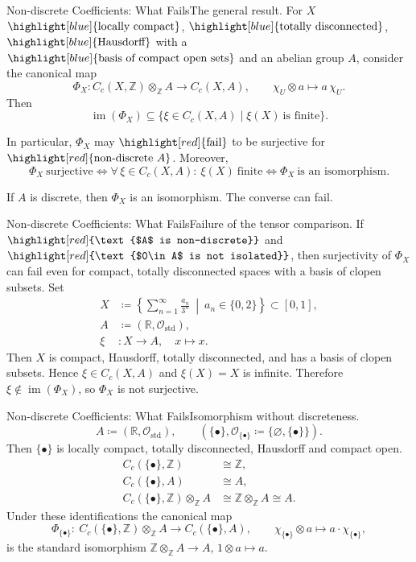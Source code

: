 \documentclass[aspectratio=169]{beamer}
\newcommand{\ZZ}{\mathbb{Z}}
\begin{document}
\begin{frame}{Non-discrete Coefficients: What Fails}{The general result.}
For \(X\) $\highlight[blue]{\text{locally compact}}$, $\highlight[blue]{\text{totally disconnected}}$, $\highlight[blue]{\text{Hausdorff}}$ with a $\highlight[blue]{\text{basis of compact open sets}}$ and an abelian group \(A\), consider the canonical map
\[
\Phi_X\colon C_c(X,\ZZ)\otimes_{\ZZ}A \to C_c(X,A),
\qquad
\chi_U\otimes a \mapsto a\,\chi_U.
\]
Then
\[
\operatorname{im}(\Phi_X)\subseteq \{\xi\in C_c(X,A)\mid \xi(X)\ \text{is finite}\}.
\]
\pause

In particular, \(\Phi_X\) may $\highlight[red]{\text{fail}}$ to be surjective for $\highlight[red]{\text{non-discrete } A}$.
Moreover,
\[
\Phi_X\ \text{surjective}
\Leftrightarrow
\forall\,\xi\in C_c(X,A):\ \xi(X)\ \text{finite}
\Leftrightarrow
\Phi_X\ \text{is an isomorphism}.
\]
\pause

If \(A\) is discrete, then \(\Phi_X\) is an isomorphism.
The converse can fail.
\end{frame}

\begin{frame}{Non-discrete Coefficients: What Fails}{Failure of the tensor comparison.}
If $\highlight[red]{\text{$A$ is non-discrete}}$ and $\highlight[red]{\text{$0\in A$ is not isolated}}$, then surjectivity of \(\Phi_X\) can fail even for compact, totally disconnected spaces with a basis of clopen subsets.
Set
\[
\begin{aligned}
X &\coloneqq \left\{\sum_{n=1}^\infty \frac{a_n}{3^n}\ \middle|\ a_n\in\{0,2\}\right\}\subset [0,1],\\
A &\coloneqq (\mathbb{R},\mathcal{O}_{\mathrm{std}}),\\
\xi &\colon X\to A,\quad x\mapsto x.
\end{aligned}
\]
Then \(X\) is compact, Hausdorff, totally disconnected, and has a basis of clopen subsets.
Hence \(\xi\in C_c(X,A)\) and \(\xi(X)=X\) is infinite.
Therefore \(\xi\notin \operatorname{im}(\Phi_X)\), so \(\Phi_X\) is not surjective.
\end{frame}

\begin{frame}{Non-discrete Coefficients: What Fails}{Isomorphism without discreteness.}
\[
A \coloneqq (\mathbb{R},\mathcal{O}_{\mathrm{std}}),
\qquad
(\{\bullet\}, \mathcal{O}_{\{\bullet\}}\coloneq\{\varnothing,\{\bullet\}\}).
\]
Then $\{\bullet\}$ is locally compact, totally disconnected, Hausdorff and compact open.
\[
\begin{aligned}
C_c(\{\bullet\},\mathbb{Z}) &\cong \mathbb{Z},\\
C_c(\{\bullet\},A) &\cong A,\\
C_c(\{\bullet\},\mathbb{Z})\otimes_{\mathbb{Z}}A &\cong \mathbb{Z}\otimes_{\mathbb{Z}}A\cong A.
\end{aligned}
\]
Under these identifications the canonical map
\[
\Phi_{\{\bullet\}}:\ C_c(\{\bullet\},\mathbb{Z})\otimes_{\mathbb{Z}}A\to C_c(\{\bullet\},A),
\qquad
\chi_{\{\bullet\}}\otimes a\mapsto a\cdot \chi_{\{\bullet\}},
\]
is the standard isomorphism $\mathbb{Z}\otimes_{\mathbb{Z}}A\to A$, $1\otimes a\mapsto a$.
\end{frame}
\end{document}
